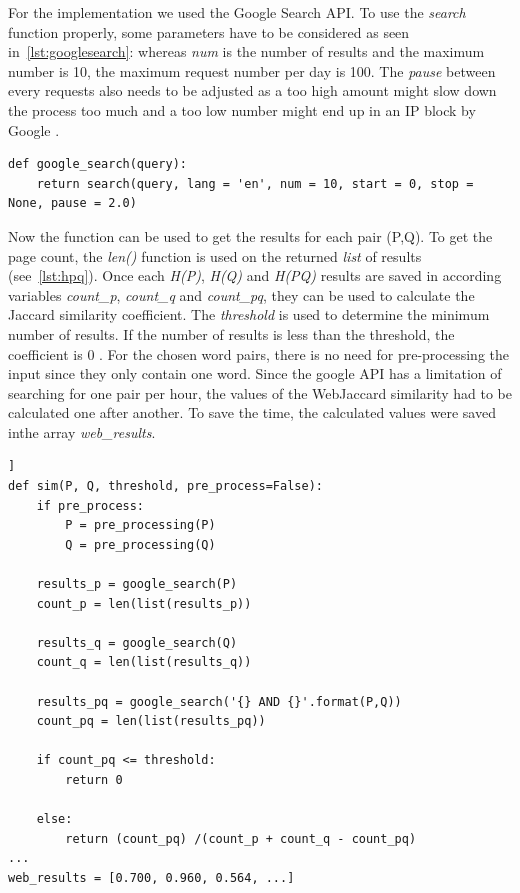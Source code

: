 \documentclass[conference]{IEEEtran}
\begin{document}
For the implementation we used the Google Search API. To use the \textit{search} function properly, some parameters have to be considered as seen in~\ref{lst:googlesearch}: whereas \textit{num} is the number of results and the maximum number is 10, the maximum request number per day is 100. The \textit{pause} between every requests also needs to be adjusted as a too high amount might slow down the process too much and a too low number might end up in an IP block by Google \cite{search}.

\begin{lstlisting}[frame=single, label=lst:googlesearch, caption={Google search function}, captionpos=b]
def google_search(query):
    return search(query, lang = 'en', num = 10, start = 0, stop = None, pause = 2.0)
\end{lstlisting}

Now the function can be used to get the results for each pair (P,Q). To get the page count, the \textit{len()} function is used on the returned \textit{list} of results (see~\ref{lst:hpq}). Once each \textit{H(P)}, \textit{H(Q)} and \textit{H(PQ)} results are saved in according variables \textit{count\_p}, \textit{count\_q} and \textit{count\_pq}, they can be used to calculate the Jaccard similarity coefficient. The \textit{threshold} is used to determine the minimum number of results. If the number of results is less than the threshold, the coefficient is 0 \cite{websim}. For the chosen word pairs, there is no need for pre-processing the input since they only contain one word. Since the google API has a limitation of searching for one pair per hour, the values of the WebJaccard similarity had to be calculated one after another. To save the time, the calculated values were saved inthe array \textit{web\_results}.

\begin{lstlisting}[frame=single, label=lst:hpq, caption={Getting google results and calculation of WebJaccard similarity}, captionpos=b]]
def sim(P, Q, threshold, pre_process=False):
    if pre_process:
        P = pre_processing(P)
        Q = pre_processing(Q)

    results_p = google_search(P)
    count_p = len(list(results_p))

    results_q = google_search(Q)
    count_q = len(list(results_q))
    
    results_pq = google_search('{} AND {}'.format(P,Q))
    count_pq = len(list(results_pq))
    
    if count_pq <= threshold:
        return 0
    
    else:
        return (count_pq) /(count_p + count_q - count_pq)
...
web_results = [0.700, 0.960, 0.564, ...]
\end{lstlisting}
\end{document}
